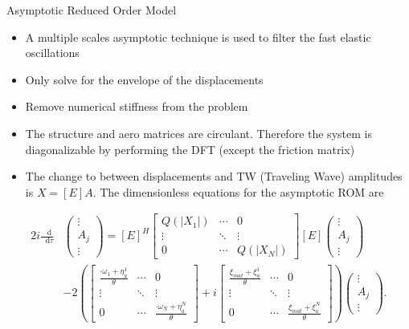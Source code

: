 \documentclass[dvipsnames, aspectratio = 169]{beamer}
\newcommand*\df{\mathop{}\!\mathrm{d}}
\begin{document}
\begin{frame}{Asymptotic Reduced Order Model}
	\begin{itemize}
		\item A multiple scales asymptotic technique is used to filter the fast elastic oscillations
		\item Only solve for the envelope of the displacements
		\item Remove numerical stiffness from the problem
		\item The structure and aero matrices are circulant. Therefore the system is diagonalizable by performing the DFT (except the friction matrix)
		\item The change to between displacements and TW (Traveling Wave) amplitudes is $ X = [E]A $. The dimensionless equations for the asymptotic ROM are
	\end{itemize}
	\begin{equation}\label{eq:tuned_TW_Basis_system}
		\begin{split}
			2i\frac{\df}{\df \tau}&\begin{pmatrix}
				\vdots \\
				A_j    \\
				\vdots
			\end{pmatrix}
			= [E]^H\begin{bmatrix}
				Q(|X_1|) & \cdots & 0        \\
				\vdots   & \ddots & \vdots   \\
				0        & \cdots & Q(|X_N|)
			\end{bmatrix}[E]\begin{pmatrix}
				\vdots \\
				A_j    \\
				\vdots
			\end{pmatrix}\\
			&- 2\left(\begin{bmatrix}
					\frac{·\omega_1 + \eta_a^1}{\theta} & \cdots & 0                                   \\
					\vdots                              & \ddots & \vdots                              \\
					0                                   & \cdots & \frac{·\omega_N + \eta_a^N}{\theta}
				\end{bmatrix}
			+ i \begin{bmatrix}
					\frac{\xi_{mat} + \xi_a^1}{\theta} & \cdots & 0                                  \\
					\vdots                             & \ddots & \vdots                             \\
					0                                  & \cdots & \frac{\xi_{mat} + \xi_a^N}{\theta}
				\end{bmatrix}
			\right)\begin{pmatrix}
				\vdots \\
				A_j    \\
				\vdots
			\end{pmatrix}.
		\end{split}
	\end{equation}
\end{frame}
\end{document}
